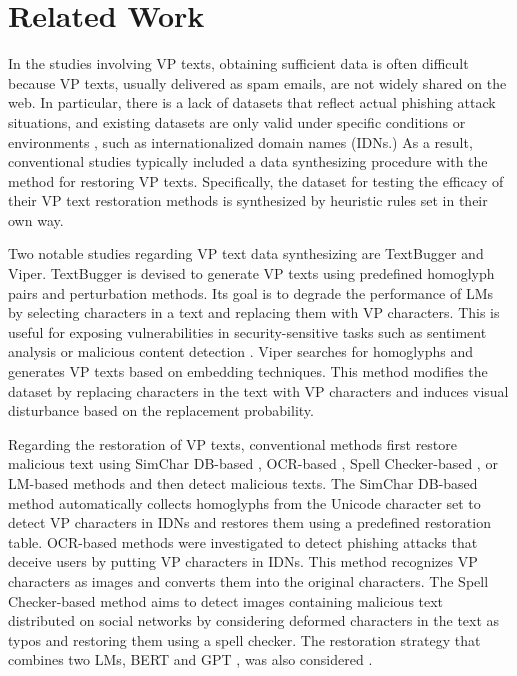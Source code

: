 \section{Related Work}
In the studies involving VP texts, obtaining sufficient data is often difficult because VP texts, usually delivered as spam emails, are not widely shared on the web. In particular, there is a lack of datasets that reflect actual phishing attack situations, and existing datasets are only valid under specific conditions or environments \citep{elsayed2018large, suzuki2019shamfinder, yazdani2020case, almuhaideb2022homoglyph}, such as internationalized domain names (IDNs.) As a result, conventional studies typically included a data synthesizing procedure with the method for restoring VP texts. Specifically, the dataset for testing the efficacy of their VP text restoration methods is synthesized by heuristic rules set in their own way.

Two notable studies regarding VP text data synthesizing are TextBugger \citep{li2019textbugger} and Viper. TextBugger is devised to generate VP texts using predefined homoglyph pairs and perturbation methods. Its goal is to degrade the performance of LMs by selecting characters in a text and replacing them with VP characters. This is useful for exposing vulnerabilities in security-sensitive tasks such as sentiment analysis \citep{pang2008opinion} or malicious content detection \citep{hou2010malicious}. Viper searches for homoglyphs and generates VP texts based on embedding techniques. This method modifies the dataset by replacing characters in the text with VP characters and induces visual disturbance based on the replacement probability.

Regarding the restoration of VP texts, conventional methods first restore malicious text using SimChar DB-based \citep{suzuki2019shamfinder}, OCR-based \citep{sawabe2019detection}, Spell Checker-based \citep{imam2022ocr}, or LM-based methods \citep{keller2021bert} and then detect malicious texts. The SimChar DB-based method automatically collects homoglyphs from the Unicode character set to detect VP characters in IDNs and restores them using a predefined restoration table. OCR-based methods were investigated to detect phishing attacks that deceive users by putting VP characters in IDNs. This method recognizes VP characters as images and converts them into the original characters. The Spell Checker-based method aims to detect images containing malicious text distributed on social networks by considering deformed characters in the text as typos and restoring them using a spell checker. The restoration strategy that combines two LMs, BERT \citep{devlin2019bert} and GPT \citep{radford2018improving}, was also considered \citep{keller2021bert}.

